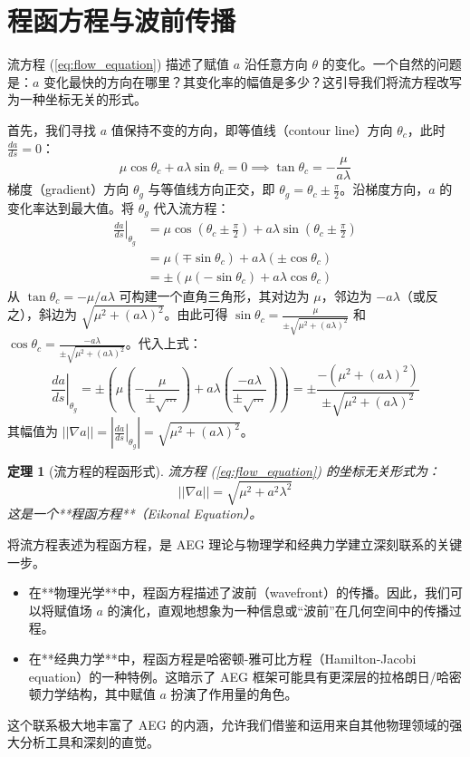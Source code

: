 \documentclass[a4paper,12pt]{book}
\numberwithin{problem}{section}
\numberwithin{definition}{section}
\numberwithin{lemma}{section}
\numberwithin{proposition}{section}
\newtheorem{theorem}{定理}
\numberwithin{theorem}{section}
\numberwithin{grammar}{section}
\numberwithin{program}{section}
\numberwithin{convention}{section}
\numberwithin{corollary}{section}
\begin{document}
\section{程函方程与波前传播}
\label{sec:eikonal_equation}

流方程 (\ref{eq:flow_equation}) 描述了赋值 $a$ 沿任意方向 $\theta$ 的变化。一个自然的问题是：$a$ 变化最快的方向在哪里？其变化率的幅值是多少？这引导我们将流方程改写为一种坐标无关的形式。

首先，我们寻找 $a$ 值保持不变的方向，即等值线（contour line）方向 $\theta_c$，此时 $\frac{da}{ds}=0$：
\[ \mu\cos\theta_c + a\lambda\sin\theta_c = 0 \implies \tan\theta_c = -\frac{\mu}{a\lambda} \]
梯度（gradient）方向 $\theta_g$ 与等值线方向正交，即 $\theta_g = \theta_c \pm \frac{\pi}{2}$。沿梯度方向，$a$ 的变化率达到最大值。将 $\theta_g$ 代入流方程：
\begin{align*}
    \left. \frac{da}{ds} \right|_{\theta_g} &= \mu\cos(\theta_c \pm \frac{\pi}{2}) + a\lambda\sin(\theta_c \pm \frac{\pi}{2}) \\
    &= \mu(\mp\sin\theta_c) + a\lambda(\pm\cos\theta_c) \\
    &= \pm (\mu(-\sin\theta_c) + a\lambda\cos\theta_c)
\end{align*}
从 $\tan\theta_c = -{\mu}/{a\lambda}$ 可构建一个直角三角形，其对边为 $\mu$，邻边为 $-a\lambda$（或反之），斜边为 $\sqrt{\mu^2 + (a\lambda)^2}$。由此可得 $\sin\theta_c = \frac{\mu}{\pm\sqrt{\mu^2+(a\lambda)^2}}$ 和 $\cos\theta_c = \frac{-a\lambda}{\pm\sqrt{\mu^2+(a\lambda)^2}}$。代入上式：
\[
\left. \frac{da}{ds} \right|_{\theta_g} = \pm \left( \mu\left(-\frac{\mu}{\pm\sqrt{\dots}}\right) + a\lambda\left(\frac{-a\lambda}{\pm\sqrt{\dots}}\right) \right) = \pm \frac{-(\mu^2 + (a\lambda)^2)}{\pm\sqrt{\mu^2+(a\lambda)^2}}
\]
其幅值为 $||\nabla a|| = \left| \left. \frac{da}{ds} \right|_{\theta_g} \right| = \sqrt{\mu^2 + (a\lambda)^2}$。

\begin{theorem}[流方程的程函形式]
    \label{thm:eikonal_form}
    流方程 (\ref{eq:flow_equation}) 的坐标无关形式为：
    \begin{equation}
        ||\nabla a|| = \sqrt{\mu^2 + a^2\lambda^2}
        \label{eq:eikonal_equation}
    \end{equation}
    这是一个**程函方程**（Eikonal Equation）。
\end{theorem}

将流方程表述为程函方程，是 AEG 理论与物理学和经典力学建立深刻联系的关键一步。
\begin{itemize}
    \item 在**物理光学**中，程函方程描述了波前（wavefront）的传播。因此，我们可以将赋值场 $a$ 的演化，直观地想象为一种信息或“波前”在几何空间中的传播过程。
    \item 在**经典力学**中，程函方程是哈密顿-雅可比方程（Hamilton-Jacobi equation）的一种特例。这暗示了 AEG 框架可能具有更深层的拉格朗日/哈密顿力学结构，其中赋值 $a$ 扮演了作用量的角色。
\end{itemize}
这个联系极大地丰富了 AEG 的内涵，允许我们借鉴和运用来自其他物理领域的强大分析工具和深刻的直觉。
\end{document}
